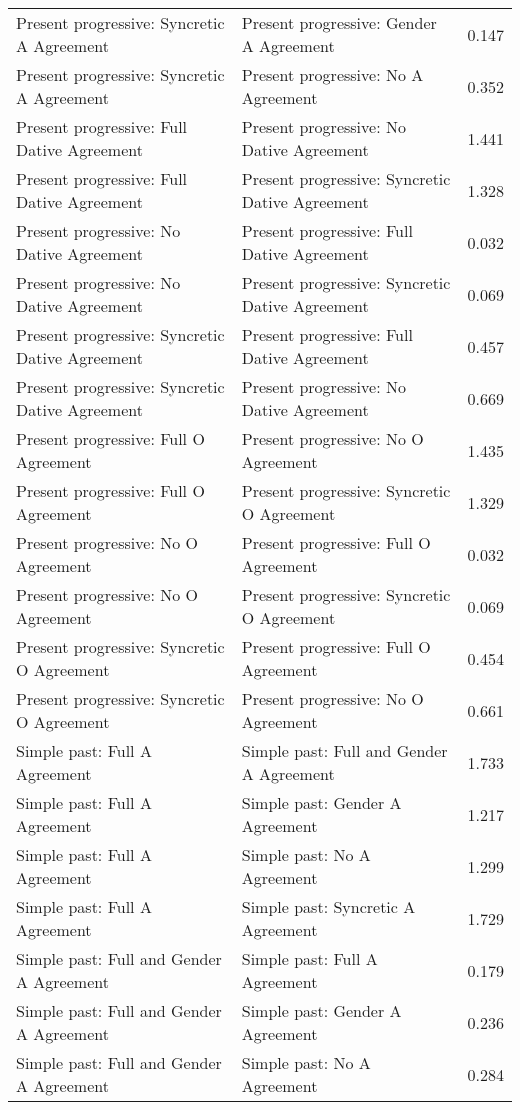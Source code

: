 \begin{longtable}{p{.4\linewidth}p{.4\linewidth}p{.1\linewidth}}
Present progressive: Syncretic A Agreement & Present progressive: Gender A Agreement & 0.147\\
Present progressive: Syncretic A Agreement & Present progressive: No A Agreement & 0.352\\
Present progressive: Full Dative Agreement & Present progressive: No Dative Agreement & 1.441\\
Present progressive: Full Dative Agreement & Present progressive: Syncretic Dative Agreement & 1.328\\
Present progressive: No Dative Agreement & Present progressive: Full Dative Agreement & 0.032\\
Present progressive: No Dative Agreement & Present progressive: Syncretic Dative Agreement & 0.069\\
Present progressive: Syncretic Dative Agreement & Present progressive: Full Dative Agreement & 0.457\\
Present progressive: Syncretic Dative Agreement & Present progressive: No Dative Agreement & 0.669\\
Present progressive: Full O Agreement & Present progressive: No O Agreement & 1.435\\
Present progressive: Full O Agreement & Present progressive: Syncretic O Agreement & 1.329\\
Present progressive: No O Agreement & Present progressive: Full O Agreement & 0.032\\
Present progressive: No O Agreement & Present progressive: Syncretic O Agreement & 0.069\\
Present progressive: Syncretic O Agreement & Present progressive: Full O Agreement & 0.454\\
Present progressive: Syncretic O Agreement & Present progressive: No O Agreement & 0.661\\
Simple past: Full A Agreement & Simple past: Full and Gender A Agreement & 1.733\\
Simple past: Full A Agreement & Simple past: Gender A Agreement & 1.217\\
Simple past: Full A Agreement & Simple past: No A Agreement & 1.299\\
Simple past: Full A Agreement & Simple past: Syncretic A Agreement & 1.729\\
Simple past: Full and Gender A Agreement & Simple past: Full A Agreement & 0.179\\
Simple past: Full and Gender A Agreement & Simple past: Gender A Agreement & 0.236\\
Simple past: Full and Gender A Agreement & Simple past: No A Agreement & 0.284\\

\end{longtable}
